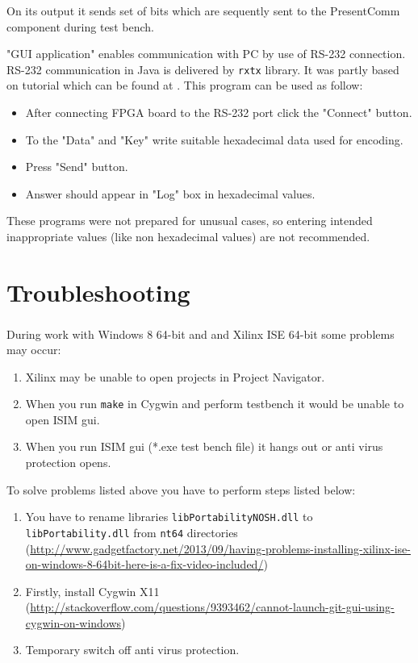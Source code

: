 \documentclass{gajewski}
\begin{document}
On its output it sends set of bits which are sequently sent to the PresentComm component during test bench.

"GUI application" enables communication with PC by use of RS-232 connection. RS-232 communication in Java is delivered by  \texttt{rxtx} library. It was partly based on tutorial which can be found at \cite{GUIComm}. 
This program can be used as follow:
\begin{itemize}
    \item After connecting FPGA board to the RS-232 port click the "Connect" button.
    \item To the "Data" and "Key" write suitable hexadecimal data used for encoding.
    \item Press "Send" button.
    \item Answer should appear in "Log" box in hexadecimal values.
\end{itemize}
These programs were not prepared for unusual cases, so entering intended inappropriate values (like non hexadecimal values) are not recommended.

\newpage

\section{Troubleshooting}

During work with Windows 8 64-bit and and Xilinx\textsuperscript{\textregistered} ISE 64-bit some problems may occur:

\begin{enumerate}
    \item Xilinx may be unable to open projects in Project Navigator.
    \item When you run \texttt{make} in Cygwin and perform testbench it would be unable to open ISIM gui.
    \item When you run ISIM gui  (*.exe test bench file) it hangs out or anti virus protection opens.
\end{enumerate}

To solve problems listed above you have to perform steps listed below:
\begin{enumerate}
    \item You have to rename libraries \texttt{libPortabilityNOSH.dll} to \texttt{libPortability.dll} from \texttt{nt64} directories (\href{http://www.gadgetfactory.net/2013/09/having-problems-installing-xilinx-ise-on-windows-8-64bit-here-is-a-fix-video-included/}{http://www.gadgetfactory.net/2013/09/having-problems-installing-xilinx-ise-on-windows-8-64bit-here-is-a-fix-video-included/})
    \item Firstly, install Cygwin X11 (\href{http://stackoverflow.com/questions/9393462/cannot-launch-git-gui-using-cygwin-on-windows}{http://stackoverflow.com/questions/9393462/cannot-launch-git-gui-using-cygwin-on-windows})
    \item Temporary switch off anti virus protection.
\end{enumerate}
\end{document}
